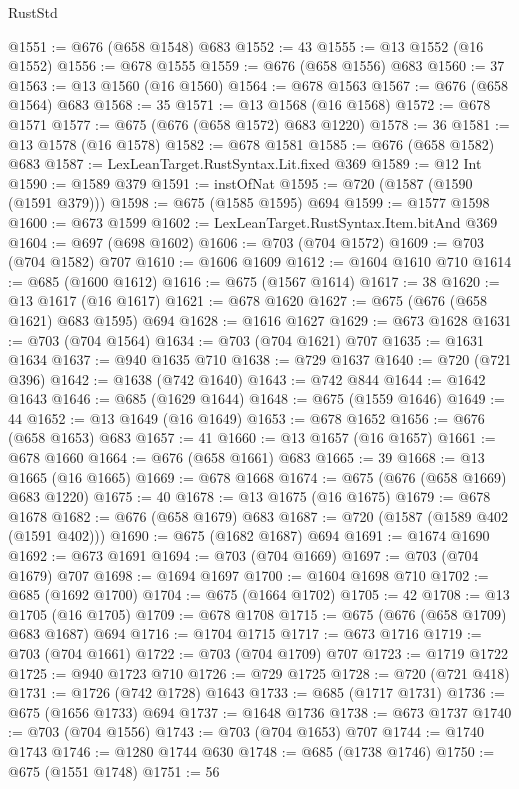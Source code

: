 \begin{lexlean}{RustStd}
\begin{coremodule}
@1551 := @676 (@658 @1548) @683
@1552 := 43
@1555 := @13 @1552 (@16 @1552)
@1556 := @678 @1555
@1559 := @676 (@658 @1556) @683
@1560 := 37
@1563 := @13 @1560 (@16 @1560)
@1564 := @678 @1563
@1567 := @676 (@658 @1564) @683
@1568 := 35
@1571 := @13 @1568 (@16 @1568)
@1572 := @678 @1571
@1577 := @675 (@676 (@658 @1572) @683 @1220)
@1578 := 36
@1581 := @13 @1578 (@16 @1578)
@1582 := @678 @1581
@1585 := @676 (@658 @1582) @683
@1587 := LexLeanTarget.RustSyntax.Lit.fixed @369
@1589 := @12 Int
@1590 := @1589 @379
@1591 := instOfNat
@1595 := @720 (@1587 (@1590 (@1591 @379)))
@1598 := @675 (@1585 @1595) @694
@1599 := @1577 @1598
@1600 := @673 @1599
@1602 := LexLeanTarget.RustSyntax.Item.bitAnd @369
@1604 := @697 (@698 @1602)
@1606 := @703 (@704 @1572)
@1609 := @703 (@704 @1582) @707
@1610 := @1606 @1609
@1612 := @1604 @1610 @710
@1614 := @685 (@1600 @1612)
@1616 := @675 (@1567 @1614)
@1617 := 38
@1620 := @13 @1617 (@16 @1617)
@1621 := @678 @1620
@1627 := @675 (@676 (@658 @1621) @683 @1595) @694
@1628 := @1616 @1627
@1629 := @673 @1628
@1631 := @703 (@704 @1564)
@1634 := @703 (@704 @1621) @707
@1635 := @1631 @1634
@1637 := @940 @1635 @710
@1638 := @729 @1637
@1640 := @720 (@721 @396)
@1642 := @1638 (@742 @1640)
@1643 := @742 @844
@1644 := @1642 @1643
@1646 := @685 (@1629 @1644)
@1648 := @675 (@1559 @1646)
@1649 := 44
@1652 := @13 @1649 (@16 @1649)
@1653 := @678 @1652
@1656 := @676 (@658 @1653) @683
@1657 := 41
@1660 := @13 @1657 (@16 @1657)
@1661 := @678 @1660
@1664 := @676 (@658 @1661) @683
@1665 := 39
@1668 := @13 @1665 (@16 @1665)
@1669 := @678 @1668
@1674 := @675 (@676 (@658 @1669) @683 @1220)
@1675 := 40
@1678 := @13 @1675 (@16 @1675)
@1679 := @678 @1678
@1682 := @676 (@658 @1679) @683
@1687 := @720 (@1587 (@1589 @402 (@1591 @402)))
@1690 := @675 (@1682 @1687) @694
@1691 := @1674 @1690
@1692 := @673 @1691
@1694 := @703 (@704 @1669)
@1697 := @703 (@704 @1679) @707
@1698 := @1694 @1697
@1700 := @1604 @1698 @710
@1702 := @685 (@1692 @1700)
@1704 := @675 (@1664 @1702)
@1705 := 42
@1708 := @13 @1705 (@16 @1705)
@1709 := @678 @1708
@1715 := @675 (@676 (@658 @1709) @683 @1687) @694
@1716 := @1704 @1715
@1717 := @673 @1716
@1719 := @703 (@704 @1661)
@1722 := @703 (@704 @1709) @707
@1723 := @1719 @1722
@1725 := @940 @1723 @710
@1726 := @729 @1725
@1728 := @720 (@721 @418)
@1731 := @1726 (@742 @1728) @1643
@1733 := @685 (@1717 @1731)
@1736 := @675 (@1656 @1733) @694
@1737 := @1648 @1736
@1738 := @673 @1737
@1740 := @703 (@704 @1556)
@1743 := @703 (@704 @1653) @707
@1744 := @1740 @1743
@1746 := @1280 @1744 @630
@1748 := @685 (@1738 @1746)
@1750 := @675 (@1551 @1748)
@1751 := 56

\end{coremodule}
\end{lexlean}
